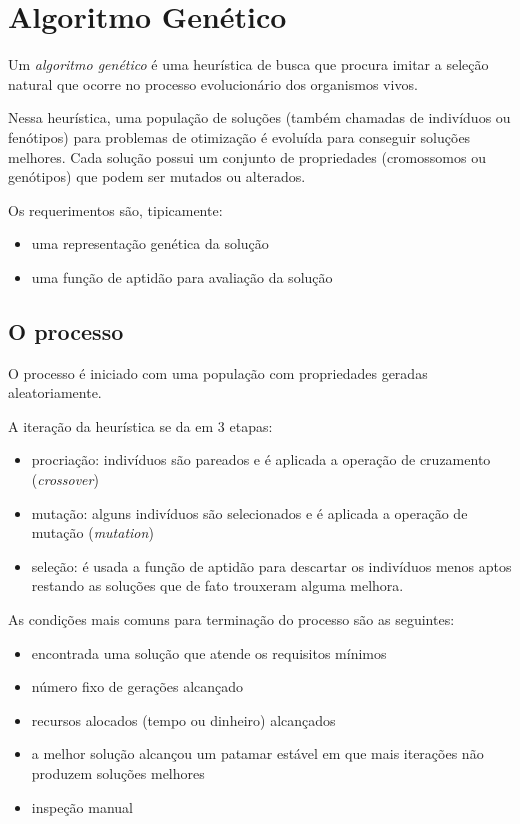 \section{Algoritmo Genético}

Um \emph{algoritmo genético} é uma heurística de busca que procura
imitar a seleção natural que ocorre no processo evolucionário dos
organismos vivos.

Nessa heurística, uma população de soluções (também chamadas de
indivíduos ou fenótipos) para problemas de otimização é evoluída para
conseguir soluções melhores. Cada solução possui um conjunto de
propriedades (cromossomos ou genótipos) que podem ser mutados ou
alterados.

Os requerimentos são, tipicamente:

\begin{itemize}
\item
  uma representação genética da solução
\item
  uma função de aptidão para avaliação da solução
\end{itemize}

\subsection{O processo}

O processo é iniciado com uma população com propriedades geradas
aleatoriamente.

A iteração da heurística se da em 3 etapas:

\begin{itemize}
\item
  procriação: indivíduos são pareados e é aplicada a operação de
  cruzamento (\emph{crossover})
\item
  mutação: alguns indivíduos são selecionados e é aplicada a operação de
  mutação (\emph{mutation})
\item
  seleção: é usada a função de aptidão para descartar os indivíduos
  menos aptos restando as soluções que de fato trouxeram alguma melhora.
\end{itemize}

As condições mais comuns para terminação do processo são as seguintes:

\begin{itemize}
\item
  encontrada uma solução que atende os requisitos mínimos
\item
  número fixo de gerações alcançado
\item
  recursos alocados (tempo ou dinheiro) alcançados
\item
  a melhor solução alcançou um patamar estável em que mais iterações não
  produzem soluções melhores
\item
  inspeção manual
\end{itemize}

